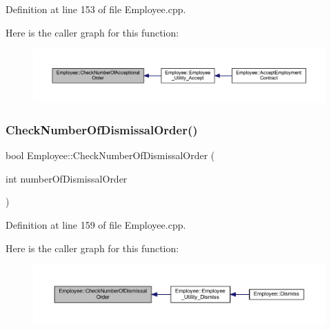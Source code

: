 Definition at line 153 of file Employee.\+cpp.

Here is the caller graph for this function\+:
\nopagebreak
\begin{figure}[H]
\begin{center}
\leavevmode
\includegraphics[width=350pt]{class_employee_a48638241e63b03873954369b285d1cd9_icgraph}
\end{center}
\end{figure}
\mbox{\label{class_employee_ac7bf1d7191d60ada37e85f8d311a254d}} 
\subsubsection{\texorpdfstring{Check\+Number\+Of\+Dismissal\+Order()}{CheckNumberOfDismissalOrder()}}
{\footnotesize\ttfamily bool Employee\+::\+Check\+Number\+Of\+Dismissal\+Order (\begin{DoxyParamCaption}\item[{int}]{number\+Of\+Dismissal\+Order }\end{DoxyParamCaption})}



Definition at line 159 of file Employee.\+cpp.

Here is the caller graph for this function\+:
\nopagebreak
\begin{figure}[H]
\begin{center}
\leavevmode
\includegraphics[width=350pt]{class_employee_ac7bf1d7191d60ada37e85f8d311a254d_icgraph}
\end{center}
\end{figure}
\mbox{\label{class_employee_a0bec05aa09e9a7a12e3c3de49c43c158}} 
